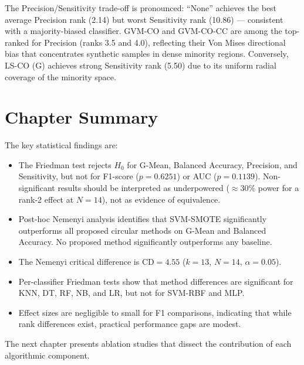 The Precision/Sensitivity trade-off is pronounced: ``None'' achieves the best average Precision rank (2.14) but worst Sensitivity rank (10.86) --- consistent with a majority-biased classifier.
GVM-CO and GVM-CO-CC are among the top-ranked for Precision (ranks 3.5 and 4.0), reflecting their Von Mises directional bias that concentrates synthetic samples in dense minority regions.
Conversely, LS-CO (G) achieves strong Sensitivity rank (5.50) due to its uniform radial coverage of the minority space.


\section{Chapter Summary}
\label{sec:stat:summary}

The key statistical findings are:
\begin{itemize}[leftmargin=*]
    \item The Friedman test rejects $H_0$ for G-Mean, Balanced Accuracy, Precision, and Sensitivity, but not for F1-score ($p = 0.6251$) or AUC ($p = 0.1139$).
    Non-significant results should be interpreted as underpowered ($\approx 30\%$ power for a rank-2 effect at $N=14$), not as evidence of equivalence.
    \item Post-hoc Nemenyi analysis identifies that SVM-SMOTE significantly outperforms all proposed circular methods on G-Mean and Balanced Accuracy.
    No proposed method significantly outperforms any baseline.
    \item The Nemenyi critical difference is $\mathrm{CD} = 4.55$ ($k = 13$, $N = 14$, $\alpha = 0.05$).
    \item Per-classifier Friedman tests show that method differences are significant for KNN, DT, RF, NB, and LR, but not for SVM-RBF and MLP.
    \item Effect sizes are negligible to small for F1 comparisons, indicating that while rank differences exist, practical performance gaps are modest.
\end{itemize}

The next chapter presents ablation studies that dissect the contribution of each algorithmic component.
